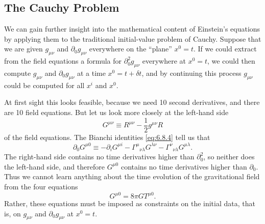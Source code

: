 
\subsection{The Cauchy Problem}\label{sec:7.5}

We can gain further insight into the mathematical content of Einstein's
equations by applying them to the traditional initial-value problem of
Cauchy. Suppose that we are given \(g_{\mu\nu}\) and
\(\partial_0g_{\mu\nu}\) everywhere on the ``plane'' \(x^0=t\). If we could
extract from the field equations a formula for
\(\partial_0^2g_{\mu\nu}\) everywhere at \(x^0=t\), we could then compute
\(g_{\mu\nu}\) and \(\partial_0g_{\mu\nu}\) at a time \(x^0=t+\delta t\),
and by continuing this process \(g_{\mu\nu}\) could be computed for all
\(x^i\) and \(x^0\).

At first sight this looks feasible, because we need 10 second derivatives,
and there are 10 field equations. But let us look more closely at the
left-hand side
\[
  G^{\mu\nu}\equiv R^{\mu\nu}-\frac12g^{\mu\nu}R
\]
of the field equations. The Bianchi identities \eqref{eq:6.8.4} tell us that
\[
  \partial_0G^{\mu0}
  \equiv
  -\partial_iG^{\mu i}
  -\Gamma^\mu{}_{\nu\lambda}G^{\lambda\nu}
  -\Gamma^\nu{}_{\nu\lambda}G^{\mu\lambda}.
\]
The right-hand side contains no time derivatives higher than
\(\partial_0^2\), so neither does the left-hand side, and therefore
\(G^{\mu0}\) contains no time derivatives higher than \(\partial_0\). Thus
we cannot learn anything about the time evolution of the gravitational field
from the four equations
\begin{equation}
  G^{\mu0}=8\pi G T^{\mu0}.
  \tag{7.5.1}\label{eq:7.5.1}
\end{equation}
Rather, these equations must be imposed as constraints on the initial data,
that is, on \(g_{\mu\nu}\) and \(\partial_0g_{\mu\nu}\) at \(x^0=t\).

